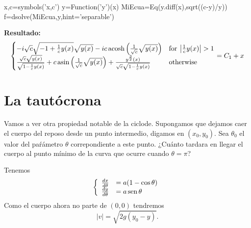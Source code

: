 \begin{subappendices}
\begin{pyverbatim}
x,c=symbols('x,c')
y=Function('y')(x)
MiEcua=Eq(y.diff(x),sqrt((c-y)/y))
f=dsolve(MiEcua,y,hint='separable')
\end{pyverbatim}

\textbf{Resultado:}
\[
 \begin{cases} - i \sqrt{c} \sqrt{-1 + \frac{1}{c} y{\left (x \right )}} \sqrt{y{\left (x \right )}} - i c \operatorname{acosh}{\left (\frac{1}{\sqrt{c}} \sqrt{y{\left (x \right )}} \right )} & \text{for}\: \left\lvert{\frac{1}{c} y{\left (x \right )}}\right\rvert > 1 \\ \- \frac{\sqrt{c} \sqrt{y{\left (x \right )}}}{\sqrt{1 - \frac{1}{c} y{\left (x \right )}}} + c \operatorname{asin}{\left (\frac{1}{\sqrt{c}} \sqrt{y{\left (x \right )}} \right )} + \frac{y^{\frac{3}{2}}{\left (x \right )}}{\sqrt{c} \sqrt{1 - \frac{1}{c} y{\left (x \right )}}} & \text{otherwise} \end{cases} = C_{1} + x
\]



\section{La tautócrona}







  Vamos a ver otra propiedad notable de la ciclode. Supongamos que dejamos caer el cuerpo del reposo desde un punto intermedio, digamos en $(x_0,y_0)$. Sea  $\theta_0$
 el valor del paŕámetro $\theta$ correpondiente a este punto. ¿Cuánto tardara en llegar el cuerpo al punto mínimo de la curva que ocurre cuando $\theta=\pi$? 


  
  

 Tenemos
\[
 \left\{ \begin{array}{l l}
 \frac{dx}{d\theta}&=a(1-\cos\theta)\\
 \frac{dy}{d\theta}&=a\sen\theta 
 \end{array}\right.
\]
% 
Como el cuerpo ahora no parte de $(0,0)$ tendremos
\[|v|=\sqrt{2g(y_0-y)}.\]



\end{subappendices}
